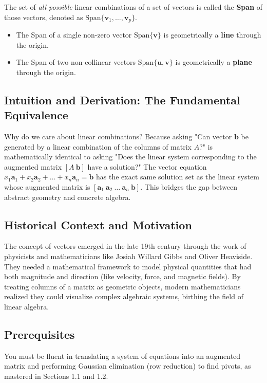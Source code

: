 \documentclass[11pt]{article}
\begin{document}
The set of \textit{all possible} linear combinations of a set of vectors is called the \textbf{Span} of those vectors, denoted as $\text{Span}\{\mathbf{v}_1, \dots, \mathbf{v}_p\}$. 
\begin{itemize}
    \item The Span of a single non-zero vector $\text{Span}\{\mathbf{v}\}$ is geometrically a \textbf{line} through the origin.
    \item The Span of two non-collinear vectors $\text{Span}\{\mathbf{u}, \mathbf{v}\}$ is geometrically a \textbf{plane} through the origin.
\end{itemize}

\subsection{Intuition and Derivation: The Fundamental Equivalence}
Why do we care about linear combinations? Because asking "Can vector $\mathbf{b}$ be generated by a linear combination of the columns of matrix $A$?" is mathematically identical to asking "Does the linear system corresponding to the augmented matrix $[A \ \mathbf{b}]$ have a solution?" 
The vector equation $x_1\mathbf{a}_1 + x_2\mathbf{a}_2 + \dots + x_n\mathbf{a}_n = \mathbf{b}$ has the exact same solution set as the linear system whose augmented matrix is $[\mathbf{a}_1 \ \mathbf{a}_2 \ \dots \ \mathbf{a}_n \ \mathbf{b}]$. This bridges the gap between abstract geometry and concrete algebra.

\subsection{Historical Context and Motivation}
The concept of vectors emerged in the late 19th century through the work of physicists and mathematicians like Josiah Willard Gibbs and Oliver Heaviside. They needed a mathematical framework to model physical quantities that had both magnitude and direction (like velocity, force, and magnetic fields). By treating columns of a matrix as geometric objects, modern mathematicians realized they could visualize complex algebraic systems, birthing the field of linear algebra.

\subsection{Prerequisites}
You must be fluent in translating a system of equations into an augmented matrix and performing Gaussian elimination (row reduction) to find pivots, as mastered in Sections 1.1 and 1.2.
\end{document}
